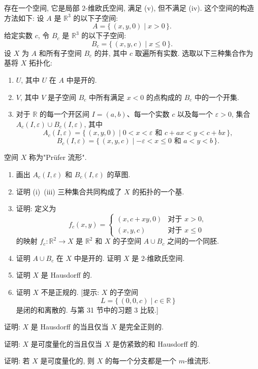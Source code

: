 \begin{exercise}
存在一个空间, 它是局部 $2$-维欧氏空间, 满足 (v), 但不满足 (iv). 这个空间的构造方法如下: 设 $A$ 是 $\mathbb{R}^{3}$ 的以下子空间:
\[
A=\{\,(x,y,0)\mid x>0\,\}.
\]
给定实数 $c$, 令 $B_c$ 是 $\mathbb{R}^{3}$ 的以下子空间:
\[
B_{c}=\{\,(x,y,c)\mid x\leqslant 0\,\}.
\]
设 $X$ 为 $A$ 和所有子空间 $B_c$ 的并, 其中 $c$ 取遍所有实数. 选取以下三种集合作为基将 $X$ 拓扑化:
\begin{enumerate}
\item $U$, 其中 $U$ 在 $A$ 中是开的.
\item $V$, 其中 $V$ 是子空间 $B_c$ 中所有满足 $x<0$ 的点构成的 $B_c$ 中的一个开集.
\item 对于 $\mathbb{R}$ 的每一个开区间 $I=(a,b)$、每一个实数 $c$ 以及每一个 $\varepsilon>0$, 集合 $A_c(I,\varepsilon)\cup B_c(I,\varepsilon)$, 其中
\[
A_{c}(I,\varepsilon)=\{\,(x,y,0)\mid 0<x<\varepsilon\text{ 和 }c+ax<y<c+bx\,\},
\]
\[
B_{c}(I,\varepsilon)=\{\,(x,y,c)\mid -\varepsilon<x\leqslant 0\text{ 和 }a<y<b\,\}.
\]
\end{enumerate}
空间 $X$ 称为"Pr\"ufer 流形".
\begin{enumerate}
\item 画出 $A_c(I,\varepsilon)$ 和 $B_c(I,\varepsilon)$ 的草图.
\item 证明 (i)~(iii) 三种集合共同构成了 $X$ 的拓扑的一个基.
\item 证明: 定义为
\[
f_{c}(x,y)=
\begin{cases}
(x,c+xy,0) & \text{对于 }x>0,\\
(x,y,c) & \text{对于 }x\leqslant 0
\end{cases}
\]
的映射 $f_c\colon\mathbb{R}^{2}\to X$ 是 $\mathbb{R}^{2}$ 和 $X$ 的子空间 $A\cup B_c$ 之间的一个同胚.
\item 证明 $A\cup B_c$ 在 $X$ 中是开的. 证明 $X$ 是 $2$-维欧氏空间.
\item 证明 $X$ 是 Hausdorff 的.
\item 证明 $X$ 不是正规的. [提示: $X$ 的子空间
\[
L=\{\,(0,0,c)\mid c\in\mathbb{R}\,\}
\]
是闭的和离散的. 与第 31 节中的习题 3 比较.]
\end{enumerate}
\end{exercise}

\begin{exercise}
证明: $X$ 是 Hausdorff 的当且仅当 $X$ 是完全正则的.
\end{exercise}

\begin{exercise}
证明: $X$ 是可度量化的当且仅当 $X$ 是仿紧致的和 Hausdorff 的.
\end{exercise}

\begin{exercise}
证明: 若 $X$ 是可度量化的, 则 $X$ 的每一个分支都是一个 $m$-维流形.
\end{exercise}
